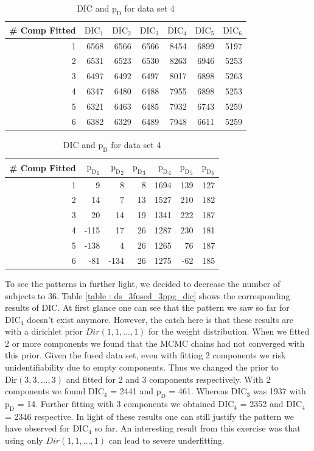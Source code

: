 \begin{table}[!htb]
\centering
\caption{DIC and $\text{p}_\text{D}$ for data set 4}
\label{table : ds_3fused_10ppg_dic}
\begin{tabular}{@{}rrrrrrr@{}}
\toprule
\# Comp Fitted & $\text{DIC}_1$ & $\text{DIC}_2$  & $\text{DIC}_3$  & $\text{DIC}_4$  & $\text{DIC}_5$  & $\text{DIC}_6$  \\ \midrule
1 & 6568 & 6566 & 6566 & 8454 & 6899 & 5197 \\
2 & 6531 & 6523 & 6530 & 8263 & 6946 & 5253 \\
3 & 6497 & 6492 & 6497 & 8017 & 6898 & 5263 \\
4 & 6347 & 6480 & 6488 & 7955 & 6898 & 5253 \\
5 & 6321 & 6463 & 6485 & 7932 & 6743 & 5259 \\
6 & 6382 & 6329 & 6489 & 7948 & 6611 & 5259 \\ \bottomrule
\end{tabular}

\begin{tabular}{@{}rrrrrrr@{}}
\toprule
\# Comp Fitted & ${\text{p}_\text{D}}_1$ & ${\text{p}_\text{D}}_2$ & ${\text{p}_\text{D}}_3$ & ${\text{p}_\text{D}}_4$ & ${\text{p}_\text{D}}_5$ & ${\text{p}_\text{D}}_6$ \\ \midrule
1 & 9 & 8 & 8 & 1694 & 139 & 127 \\
2 & 14 & 7 & 13 & 1527 & 210 & 182 \\
3 & 20 & 14 & 19 & 1341 & 222 & 187 \\
4 & -115 & 17 & 26 & 1287 & 230 & 181 \\
5 & -138 & 4 & 26 & 1265 & 76 & 187 \\
6 & -81 & -134 & 26 & 1275 & -62 & 185 \\ \bottomrule
\end{tabular}
\end{table}

To see the patterns in further light, we decided to decrease the number of subjects to 36. Table \ref{table : ds_3fused_3ppg_dic} shows the corresponding results of DIC. At first glance one can see that the pattern we saw so far for $\text{DIC}_4$ doesn't exist anymore. However, the catch here is that these results are with a dirichlet prior $Dir(1, 1, ..., 1)$ for the weight distribution. When we fitted 2 or more components we found that the MCMC chains had not converged with this prior. Given the fused data set, even with fitting 2 components we risk unidentifiability due to empty components. Thus we changed the prior to $\text{Dir}(3, 3, ..., 3)$ and fitted for 2 and 3 components respectively. With 2 components we found $\text{DIC}_4$ = 2441 and $\text{p}_\text{D}$ = 461. Whereas $\text{DIC}_3$ was 1937 with $\text{p}_\text{D}$ = 14. Further fitting with 3 components we obtained $\text{DIC}_4$ = 2352 and $\text{DIC}_4$ = 2346 respective. In light of these results one can still justify the pattern we have observed for $\text{DIC}_4$ so far. An interesting result from this exercise was that using only $Dir(1, 1, ..., 1)$ can lead to severe underfitting. 

